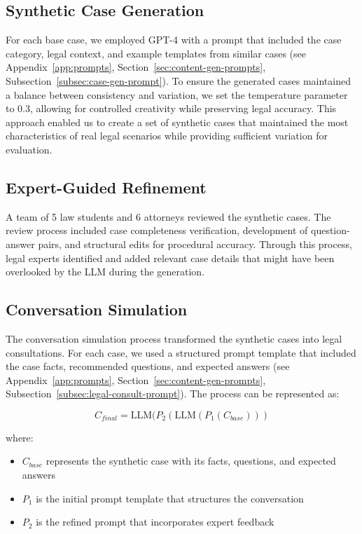 \subsection{Synthetic Case Generation}
For each base case, we employed GPT-4 with a prompt that included the case category, legal context, 
and example templates from similar cases (see Appendix~\ref{app:prompts}, Section~\ref{sec:content-gen-prompts}, 
Subsection~\ref{subsec:case-gen-prompt}). To ensure the generated cases maintained a balance between 
consistency and variation, we set the temperature parameter to 0.3, allowing for controlled creativity 
while preserving legal accuracy. This approach enabled us to create a set of synthetic cases that maintained 
the most characteristics of real legal scenarios while providing sufficient variation for evaluation.

\subsection{Expert-Guided Refinement}
A team of 5 law students and 6 attorneys reviewed the synthetic cases. The review process included case completeness verification, 
development of question-answer pairs, and structural edits for procedural accuracy. Through this process, legal experts identified and 
added relevant case details that might have been overlooked by the LLM during the generation.

\subsection{Conversation Simulation}
The conversation simulation process transformed the synthetic cases into legal consultations. For each case, 
we used a structured prompt template that included the case facts, recommended questions, and expected answers
(see Appendix~\ref{app:prompts}, Section~\ref{sec:content-gen-prompts}, 
Subsection~\ref{subsec:legal-consult-prompt}). 
The process can be represented as:

\begin{equation}
    C_{final} = \text{LLM}(P_2(\text{LLM}(P_1(C_{base})))
\end{equation}

where:
\begin{itemize}
    \item $C_{base}$ represents the synthetic case with its facts, questions, and expected answers
    \item $P_1$ is the initial prompt template that structures the conversation
    \item $P_2$ is the refined prompt that incorporates expert feedback
\end{itemize}

